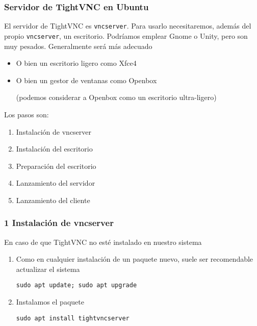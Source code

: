 \documentclass[ucs]{beamer}
\begin{document}
\begin{frame}[fragile]
\frametitle{Servidor de TightVNC en Ubuntu}

El servidor de TightVNC es 
\verb|vncserver|.
Para usarlo necesitaremos, además del propio 
\verb|vncserver|, 
un escritorio. Podríamos emplear Gnome o Unity, pero son muy pesados. Generalmente será
más adecuado

\begin{itemize}
\item
O bien un escritorio ligero como Xfce4
\item
O bien un gestor de ventanas como Openbox

(podemos considerar a Openbox como un escritorio ultra-ligero)
\end{itemize}


Los pasos son:

    \begin{enumerate}
    \item
Instalación de vncserver

    \item
Instalación del escritorio

    \item
Preparación del escritorio

    \item
Lanzamiento del servidor

    \item
Lanzamiento del cliente

    \end{enumerate}



\end{frame}
\begin{frame}[fragile]

\frametitle{1 Instalación de vncserver}


En caso de que TightVNC no esté instalado en nuestro sistema


    \begin{enumerate}
    \item
Como en cualquier instalación de un paquete nuevo, suele ser recomendable
actualizar el sistema

\verb|sudo apt update; sudo apt upgrade|

    \item
Instalamos el paquete

\verb|sudo apt install tightvncserver|
    \end{enumerate}

\end{frame}
\end{document}
